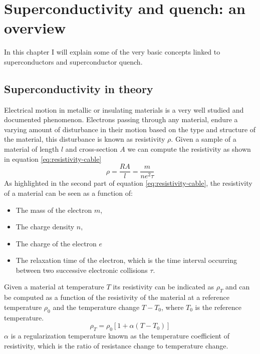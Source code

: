\chapter{Superconductivity and quench: an overview}
\label{chp:soupcond-quench}
In this chapter I will explain some of the very basic concepts linked to superconductors and
superconductor quench.
\section{Superconductivity in theory}
\label{sec:soupcond}
Electrical motion in metallic or insulating materials is a very well studied and documented
phenomenon. Electrons passing through any material, endure a varying amount of disturbance in their
motion based on the type and structure of the material, this disturbance is known as resistivity $\rho$.
Given a sample of a material of length $l$ and cross-section $A$ we can compute the resistivity as
shown in equation \ref{eq:resistivity-cable}
\begin{equation}
	\label{eq:resistivity-cable}
	\rho = \frac{RA}{l} = \frac{m}{ne^2\tau}
\end{equation}
As highlighted in the second part of equation \ref{eq:resistivity-cable}, the resistivity of a
material can be seen as a function of:
\begin{itemize}
	\item The mass of the electron $m$,
	\item The charge density $n$,
	\item The charge of the electron $e$
	\item The relaxation time of the electron, which is the time interval occurring between two
	      successive electronic collisions $\tau$.
\end{itemize}

Given a material at temperature $T$ its resistivity can be indicated as $\rho_T$ and can be computed
as a function of the resistivity of the material at a reference temperature $\rho_0$ and the
temperature change $T - T_0$, where $T_0$ is the reference temperature.
\begin{equation}
	\label{eq:resistivity-func-of-temp}
	\rho_T = \rho_0[1 + \alpha(T - T_0)]
\end{equation}
$\alpha$ is a regularization temperature known as the temperature coefficient of resistivity, which
is the ratio of resistance change to temperature change.

